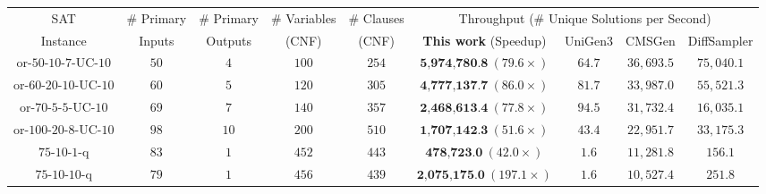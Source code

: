 \begin{tabular}{c|c|c|c|c|c|c|c|c} 
\hline
\midrule
SAT  & \# Primary & \# Primary  & \# Variables & \# Clauses & \multicolumn{4}{c}{Throughput (\# Unique Solutions per Second)}\\ 
Instance & Inputs & Outputs & (CNF) &  (CNF) & \textbf{This work} (Speedup) & {\sc UniGen3} & {\sc CMSGen} & {\sc DiffSampler}\\ 
 \midrule
or-$50$-$10$-$7$-UC-$10$ & $50$ & $4$ & $100$ & $254$ & $\textbf{5,974,780.8}~(79.6\times)$ & $64.7$ & $36,693.5$ & $75,040.1$ \\
or-$60$-$20$-$10$-UC-$10$ & $60$ & $5$ & $120$ & $305$ & $\textbf{4,777,137.7}~(86.0\times)$ & $81.7$ & $33,987.0$ & $55,521.3$ \\
or-$70$-$5$-$5$-UC-$10$ & $69$ & $7$ & $140$ & $357$ & $\textbf{2,468,613.4}~(77.8\times)$ & $94.5$ & $31,732.4$ & $16,035.1$ \\
or-$100$-$20$-$8$-UC-$10$ & $98$ & $10$ & $200$ & $510$ & $\textbf{1,707,142.3}~(51.6\times)$ & $43.4$ & $22,951.7$ & $33,175.3$ \\
 \midrule
$75$-$10$-$1$-q & $83$ & $1$ & $452$ & $443$ & $\textbf{478,723.0}~(42.0\times)$ & $1.6$ & $11,281.8$ & $156.1$ \\
$75$-$10$-$10$-q & $79$ & $1$ & $456$ & $439$ & $\textbf{2,075,175.0}~(197.1\times)$ & $1.6$ & $10,527.4$ & $251.8$ \\ 

\end{tabular}
